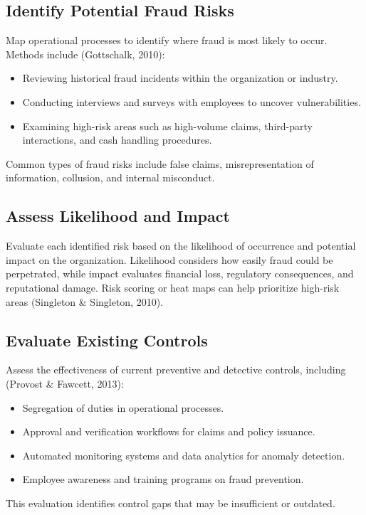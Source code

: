 \documentclass[12pt,a4paper]{article}
\begin{document}
\subsection{Identify Potential Fraud Risks}
Map operational processes to identify where fraud is most likely to occur. Methods include (Gottschalk, 2010):
\begin{itemize}
    \item Reviewing historical fraud incidents within the organization or industry.
    \item Conducting interviews and surveys with employees to uncover vulnerabilities.
    \item Examining high-risk areas such as high-volume claims, third-party interactions, and cash handling procedures.
\end{itemize}
Common types of fraud risks include false claims, misrepresentation of information, collusion, and internal misconduct.

\subsection{Assess Likelihood and Impact}
Evaluate each identified risk based on the likelihood of occurrence and potential impact on the organization. Likelihood considers how easily fraud could be perpetrated, while impact evaluates financial loss, regulatory consequences, and reputational damage. Risk scoring or heat maps can help prioritize high-risk areas (Singleton \& Singleton, 2010).

\subsection{Evaluate Existing Controls}
Assess the effectiveness of current preventive and detective controls, including (Provost \& Fawcett, 2013):
\begin{itemize}
    \item Segregation of duties in operational processes.
    \item Approval and verification workflows for claims and policy issuance.
    \item Automated monitoring systems and data analytics for anomaly detection.
    \item Employee awareness and training programs on fraud prevention.
\end{itemize}
This evaluation identifies control gaps that may be insufficient or outdated.
\end{document}
